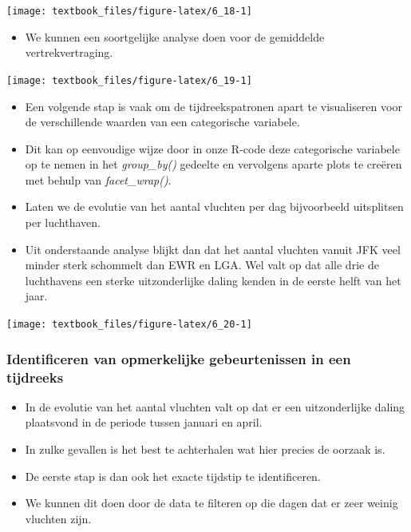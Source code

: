 \documentclass[]{tufte-book}
\providecommand{\tightlist}{%
  \setlength{\itemsep}{0pt}\setlength{\parskip}{0pt}}
\begin{document}
\texttt{[image: textbook\_files/figure-latex/6\_18-1]}

\begin{itemize}
\tightlist
\item
  We kunnen een soortgelijke analyse doen voor de gemiddelde vertrekvertraging.
\end{itemize}

\texttt{[image: textbook\_files/figure-latex/6\_19-1]}

\begin{itemize}
\tightlist
\item
  Een volgende stap is vaak om de tijdreekspatronen apart te visualiseren voor de verschillende waarden van een categorische variabele.
\item
  Dit kan op eenvoudige wijze door in onze R-code deze categorische variabele op te nemen in het \emph{group\_by()} gedeelte en vervolgens aparte plots te creëren met behulp van \emph{facet\_wrap()}.
\item
  Laten we de evolutie van het aantal vluchten per dag bijvoorbeeld uitsplitsen per luchthaven.
\item
  Uit onderstaande analyse blijkt dan dat het aantal vluchten vanuit JFK veel minder sterk schommelt dan EWR en LGA. Wel valt op dat alle drie de luchthavens een sterke uitzonderlijke daling kenden in de eerste helft van het jaar.
\end{itemize}

\texttt{[image: textbook\_files/figure-latex/6\_20-1]}

\hypertarget{identificeren-van-opmerkelijke-gebeurtenissen-in-een-tijdreeks}{%
\subsubsection{Identificeren van opmerkelijke gebeurtenissen in een tijdreeks}\label{identificeren-van-opmerkelijke-gebeurtenissen-in-een-tijdreeks}}

\begin{itemize}
\tightlist
\item
  In de evolutie van het aantal vluchten valt op dat er een uitzonderlijke daling plaatsvond in de periode tussen januari en april.
\item
  In zulke gevallen is het best te achterhalen wat hier precies de oorzaak is.
\item
  De eerste stap is dan ook het exacte tijdstip te identificeren.
\item
  We kunnen dit doen door de data te filteren op die dagen dat er zeer weinig vluchten zijn.
\end{itemize}
\end{document}
